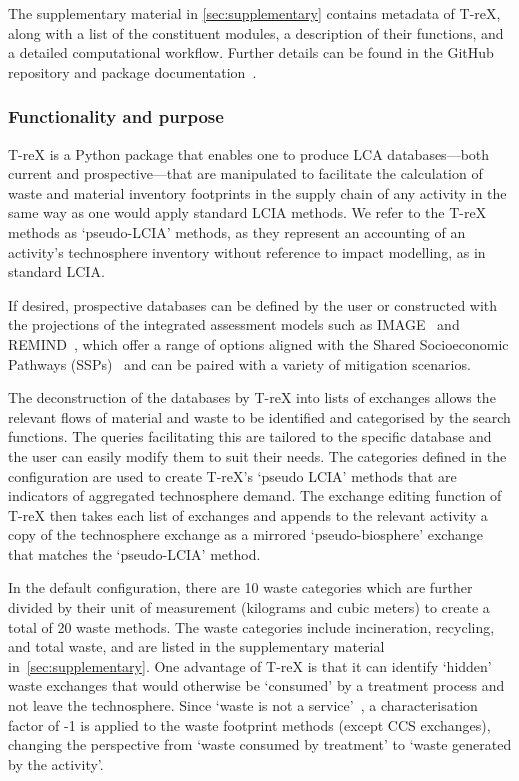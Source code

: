 The supplementary material in \autoref{sec:supplementary} contains metadata of T-reX, along with a list of the constituent modules, a description of their functions, and a detailed computational workflow. Further details can be found in the GitHub repository and package documentation~\citep{mcdowall2024T-reXgithub, mcdowall2023T-reXdocs}.

\subsubsection{Functionality and purpose}

T-reX is a Python package that enables one to produce LCA databases---both current and prospective---that are manipulated to facilitate the calculation of waste and material inventory footprints in the supply chain of any activity in the same way as one would apply standard LCIA methods. We refer to the T-reX methods as `pseudo-LCIA' methods, as they represent an accounting of an activity's technosphere inventory without reference to impact modelling, as in standard LCIA.

If desired, prospective databases can be defined by the user or constructed with the projections of the integrated assessment models such as IMAGE~\citep{stehfest2014image} and REMIND~\citep{remind2020model}, which offer a range of options aligned with the Shared Socioeconomic Pathways (SSPs)~\citep{ssp2020ghg} and can be paired with a variety of mitigation scenarios.

The deconstruction of the databases by T-reX into lists of exchanges allows the relevant flows of material and waste to be identified and categorised by the search functions. The queries facilitating this are tailored to the specific database and the user can easily modify them to suit their needs. The categories defined in the configuration are used to create T-reX's `pseudo LCIA' methods that are indicators of aggregated technosphere demand. The exchange editing function of T-reX then takes each list of exchanges and appends to the relevant activity a copy of the technosphere exchange as a mirrored `pseudo-biosphere' exchange that matches the `pseudo-LCIA' method.

In the default configuration, there are 10 waste categories which are further divided by their unit of measurement (kilograms and cubic meters) to create a total of 20 waste methods. The waste categories include incineration, recycling, and total waste, and are listed in the supplementary material in~\autoref{sec:supplementary}. One advantage of T-reX is that it can identify `hidden' waste exchanges that would otherwise be `consumed' by a treatment process and not leave the technosphere. Since `waste is not a service'~\citep{guinee2021wasteisnotaservice}, a characterisation factor of -1 is applied to the waste footprint methods (except CCS exchanges), changing the perspective from `waste consumed by treatment' to `waste generated by the activity'.

